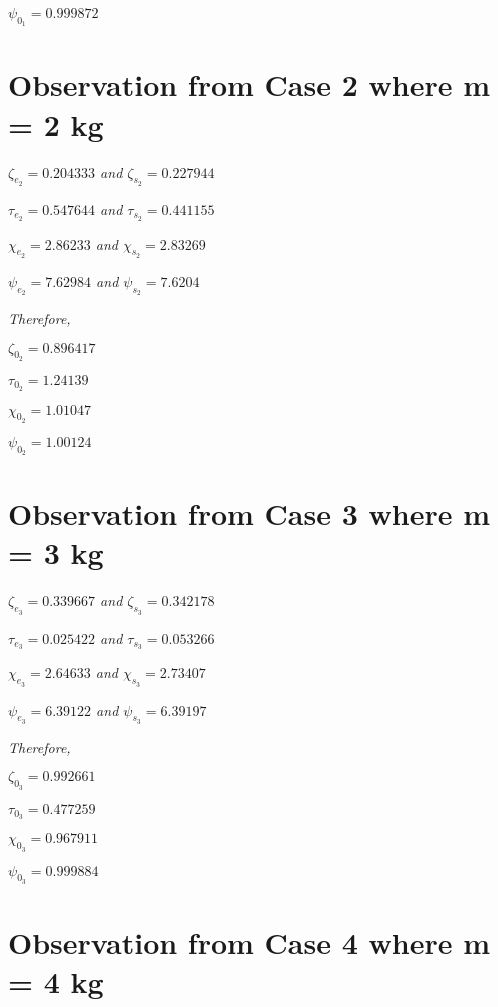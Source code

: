     $\psi_{0_1} = 0.999872$    
            
        
        
\section{{Observation from Case 2 where m = 2 kg}}
        
    \textit{$\zeta_{e_2} = 0.204333$ and $\zeta_{s_2} = 0.227944$}
            
    \textit{$\tau_{e_2} = 0.547644$ and $\tau_{s_2} = 0.441155$}
            
    \textit{$\chi_{e_2} = 2.86233$ and $\chi_{s_2} = 2.83269$}
            
    \textit{$\psi_{e_2} = 7.62984$ and $\psi_{s_2} = 7.6204$}
            
    \textit{Therefore,}
            
    $\zeta_{0_2} = 0.896417$
            
    $\tau_{0_2} = 1.24139$
            
    $\chi_{0_2} = 1.01047$
            
    $\psi_{0_2} = 1.00124$    
            
        
        
\section{{Observation from Case 3 where m = 3 kg}}
        
    \textit{$\zeta_{e_3} = 0.339667$ and $\zeta_{s_3} = 0.342178$}
            
    \textit{$\tau_{e_3} = 0.025422$ and $\tau_{s_3} = 0.053266$}
            
    \textit{$\chi_{e_3} = 2.64633$ and $\chi_{s_3} = 2.73407$}
            
    \textit{$\psi_{e_3} = 6.39122$ and $\psi_{s_3} = 6.39197$}
            
    \textit{Therefore,}
            
    $\zeta_{0_3} = 0.992661$
            
    $\tau_{0_3} = 0.477259$
            
    $\chi_{0_3} = 0.967911$
            
    $\psi_{0_3} = 0.999884$    
            
        
        
\section{{Observation from Case 4 where m = 4 kg}}
        
